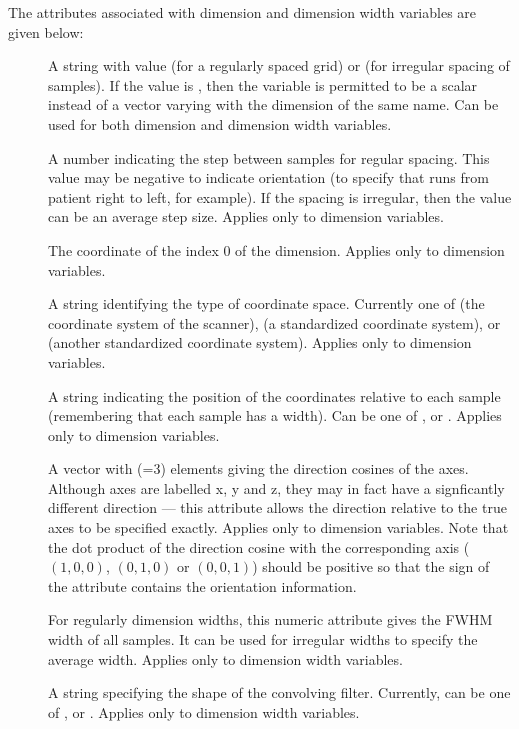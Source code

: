 \documentclass{article}
\begin{document}
The attributes associated with dimension and dimension width variables
are given below:
\begin{description}
   \item [] A string with value  (for
      a regularly spaced grid) or  (for irregular
      spacing of samples). If the value is , then the
      variable is permitted to be a scalar instead of a vector varying
      with the dimension of the same name. Can be used for both
      dimension and dimension width variables.
   \item [] A number indicating the step between samples
      for regular spacing. This value may be negative to indicate
      orientation (to specify that  runs from patient
      right to left, for example). If the spacing is irregular, then
      the value can be an average step size. Applies only to dimension
      variables. 
   \item [] The coordinate of the index 0 of the dimension.
      Applies only to dimension variables.
   \item [] A string identifying the type of
      coordinate space. Currently one of  (the
      coordinate system of the scanner),  (a
      standardized coordinate system), or  (another
      standardized coordinate system). Applies only to dimension variables.
   \item [] A string indicating the position of the
      coordinates relative to each sample (remembering that each sample
      has a width). Can be one of ,  or
      . Applies only to dimension variables.
   \item [] A vector with
      (=3) elements giving the
      direction cosines of the axes. Although axes are labelled x, y
      and z, they may in fact have a signficantly different
      direction --- this attribute allows the direction relative to
      the true axes to be specified exactly. Applies only to dimension
      variables. Note that the dot product of the direction cosine
      with the corresponding axis ($(1,0,0)$, $(0,1,0)$ or $(0,0,1)$)
      should be positive so that the sign of the attribute
       contains the orientation information.
   \item [] For regularly dimension widths, this
      numeric attribute gives the FWHM width of all samples. It can be used
      for irregular widths to specify the average width. Applies only
      to dimension width variables.
   \item [] A string specifying the shape of the
      convolving filter. Currently, can be one of ,
       or . Applies only to
      dimension width variables.
\end{description}
\end{document}
